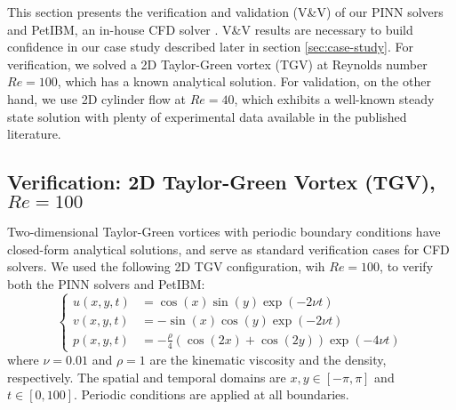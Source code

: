 
This section presents the verification and validation (V\&V) of our PINN solvers and PetIBM, an in-house CFD solver \cite{chuang_petibm_2018}.
V\&V results are necessary to build confidence in our case study described later in section \ref{sec:case-study}.
For verification, we solved a 2D Taylor-Green vortex (TGV) at Reynolds number $Re=\num{100}$, which has a known analytical solution.
For validation, on the other hand, we use 2D cylinder flow at $Re=40$, which exhibits a well-known steady state solution with plenty of experimental data available in the published literature.

\subsection{Verification: 2D Taylor-Green Vortex (TGV), $Re=\num{100}$}\label{sec:verification}

Two-dimensional Taylor-Green vortices with periodic boundary conditions have closed-form analytical solutions,
and serve as standard verification cases for CFD solvers.
We used the following 2D TGV configuration, wih $Re=\num{100}$, to verify both the PINN solvers and PetIBM:
\begin{equation}\label{eq:tgv}
    \left\{
        \begin{aligned}
            u(x, y, t) &= \cos(x)\sin(y)\exp(-2 \nu t) \\
            v(x, y, t) &= - \sin(x)\cos(y)\exp(-2 \nu t) \\
            p(x, y, t) &= -\frac{\rho}{4}\left(\cos(2x) + \cos(2y)\right)\exp(-4 \nu t)
        \end{aligned}
    \right.
\end{equation}
where $\nu=\num{0.01}$ and $\rho=\num{1}$ are the kinematic viscosity and the density, respectively.
The spatial and temporal domains are $x, y \in \left[-\pi, \pi\right]$ and $t \in [0, 100]$.
Periodic conditions are applied at all boundaries.

